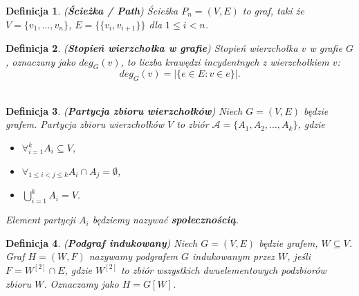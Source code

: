 \documentclass[letterpaper,12pt]{article}
\newtheorem{definition}{Definicja}
\begin{document}
\begin{definition}
  (\textbf{Ścieżka / Path}) Ścieżka \(P_n=(V,E)\) to graf, taki że \(V=\{v_1, \ldots, v_n\}\), \(E=\{\{v_i, v_{i+1}\}\}\) dla \(1 \leq i < n\).\\
\end{definition}

\begin{definition}
  (\textbf{Stopień wierzchołka w grafie}) Stopień wierzchołka \(v\) w grafie \(G\), oznaczany jako \(deg_G(v)\), to liczba krawędzi incydentnych z wierzchołkiem \(v\):
  \[deg_G(v) = |\{e \in E : v \in e\}|.\]\\
\end{definition}

\begin{definition}
  (\textbf{Partycja zbioru wierzchołków}) Niech \(G = (V, E)\) będzie grafem. Partycja zbioru wierzchołków \(V\) to zbiór \(\mathcal{A} = \{A_1, A_2, \ldots, A_k\}\), gdzie
  \begin{itemize}
    \item \(\forall_{i=1}^k A_i \subseteq V\),
    \item \(\forall_{1 \leq i < j \leq k} A_i \cap A_j = \emptyset\),
    \item \(\bigcup_{i=1}^{k} A_i = V\).
  \end{itemize}
  Element partycji \(A_i\) będziemy nazywać \textbf{społecznością}.\\
\end{definition}

\begin{definition}
  (\textbf{Podgraf indukowany}) Niech \(G = (V, E)\) będzie grafem, \(W \subseteq V\). Graf \(H = (W, F)\) nazywamy podgrafem \(G\) indukowanym przez \(W\), jeśli \(F = W^{[2]} \cap E\), gdzie \(W^{[2]}\) to zbiór wszystkich dwuelementowych podzbiorów zbioru \(W\). Oznaczamy jako \(H=G[W]\).\\
\end{definition}
\end{document}
